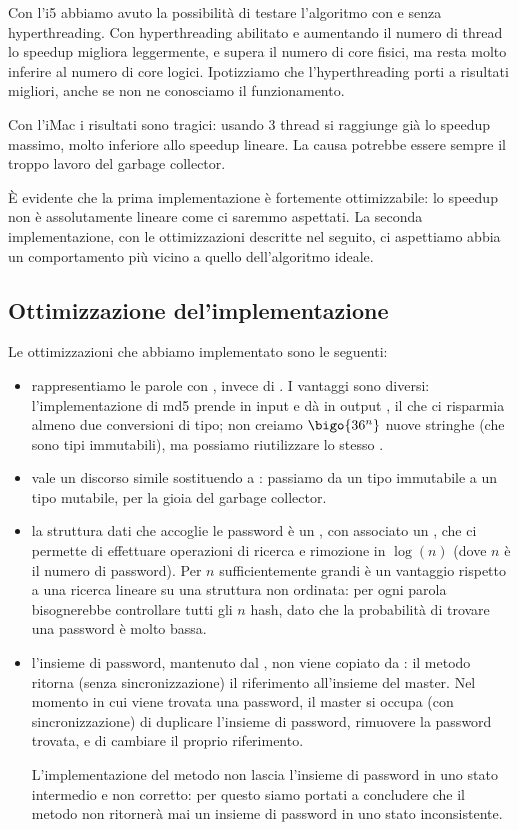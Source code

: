 \documentclass[]{myarticle}
\begin{document}
Con l'i5 abbiamo avuto la possibilit\`a di testare l'algoritmo con e senza hyperthreading.
Con hyperthreading abilitato e aumentando il numero di thread lo speedup migliora leggermente, e supera il numero di core fisici, ma resta molto inferire al numero di core logici.
Ipotizziamo che l'hyperthreading porti a risultati migliori, anche se non ne conosciamo il funzionamento.

Con l'iMac i risultati sono tragici: usando 3 thread si raggiunge gi\`a lo speedup massimo, molto inferiore allo speedup lineare.
La causa potrebbe essere sempre il troppo lavoro del garbage collector.

\`E evidente che la prima implementazione \`e fortemente ottimizzabile: lo speedup non \`e assolutamente lineare come ci saremmo aspettati.
La seconda implementazione, con le ottimizzazioni descritte nel seguito, ci aspettiamo abbia un comportamento pi\`u vicino a quello dell'algoritmo ideale.

\subsection{Ottimizzazione del'implementazione}

Le ottimizzazioni che abbiamo implementato sono le seguenti:
\begin{itemize}
	\item rappresentiamo le parole con , invece di .
	I vantaggi sono diversi: l'implementazione di md5 prende in input e d\`a in output , il che ci risparmia almeno due conversioni di tipo; non creiamo $\bigo{36^n}$ nuove stringhe (che sono tipi immutabili), ma possiamo riutilizzare lo stesso .
	\item vale un discorso simile sostituendo  a : passiamo da un tipo immutabile a un tipo mutabile, per la gioia del garbage collector.
	\item la struttura dati che accoglie le password \`e un , con associato un , che ci permette di effettuare operazioni di ricerca e rimozione in $\log(n)$ (dove $n$ \`e il numero di password).
	Per $n$ sufficientemente grandi \`e un vantaggio rispetto a una ricerca lineare su una struttura non ordinata: per ogni parola bisognerebbe controllare tutti gli $n$ hash, dato che la probabilit\`a di trovare una password \`e molto bassa.
	\item l'insieme di password, mantenuto dal , non viene copiato da : il metodo ritorna (senza sincronizzazione) il riferimento all'insieme del master.
	Nel momento in cui viene trovata una password, il master si occupa (con sincronizzazione) di duplicare l'insieme di password, rimuovere la password trovata, e di cambiare il proprio riferimento.
	
	L'implementazione del metodo  non lascia l'insieme di password in uno stato intermedio e non corretto: per questo siamo portati a concludere che il metodo  non ritorner\`a mai un insieme di password in uno stato inconsistente.
\end{itemize}
\end{document}
